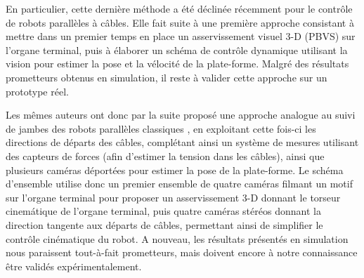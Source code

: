 En particulier, cette derni\`ere m\'ethode a \'et\'e d\'eclin\'ee r\'ecemment
pour le contr\^ole de robots parall\`eles \`a c\^ables. Elle fait suite \`a
une premi\`ere approche \cite{conf/iros/DallejGAMM11} consistant \`a mettre dans
un premier temps en place un asservissement visuel 3-D (PBVS) sur l'organe
terminal, puis \`a \'elaborer un sch\'ema de contr\^ole dynamique utilisant la
vision pour estimer la pose et la v\'elocit\'e de la plate-forme. Malgr\'e des
r\'esultats prometteurs obtenus en simulation, il reste \`a valider cette
approche sur un prototype r\'eel.

Les m\^emes auteurs ont donc par la suite propos\'e une approche analogue au
suivi de jambes des robots parall\`eles classiques \cite{dallej2012}, en
exploitant cette fois-ci les directions de d\'eparts des c\^ables, compl\'etant
ainsi un syst\`eme de mesures utilisant des capteurs de forces (afin d'estimer
la tension dans les c\^ables), ainsi que plusieurs cam\'eras d\'eport\'ees pour
estimer la pose de la plate-forme. Le sch\'ema d'ensemble utilise donc un 
premier
ensemble de quatre cam\'eras filmant un motif sur l'organe terminal pour
proposer un asservissement 3-D donnant le torseur cinem\'atique de l'organe
terminal, puis quatre cam\'eras st\'er\'eos donnant la direction tangente aux
d\'eparts de c\^ables, permettant ainsi de simplifier le contr\^ole
cin\'ematique du robot. A nouveau, les r\'esultats pr\'esent\'es en simulation
nous paraissent tout-\`a-fait prometteurs, mais doivent encore \`a notre
connaissance \^etre valid\'es exp\'erimentalement.

